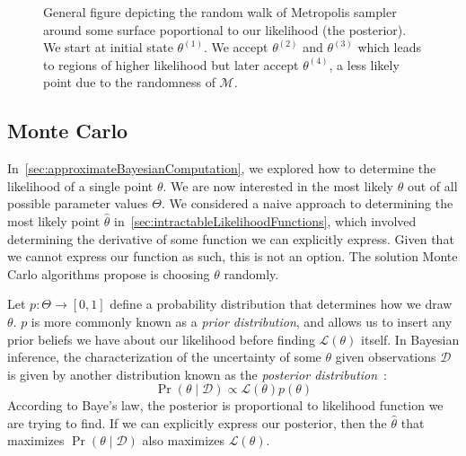 \begin{figure}[t]
    \centering{}
    \caption{General figure depicting the random walk of Metropolis sampler around some surface poportional to our
    likelihood (the posterior).
    We start at initial state $\theta^{(1)}$.
    We accept $\theta^{(2)}$ and $\theta^{(3)}$ which leads to regions of higher likelihood but later accept
    $\theta^{(4)}$, a less likely point due to the randomness of $\mathcal{M}$.
    }\label{fig:metropolisAlgorithm}
\end{figure}

\subsection{Monte Carlo}\label{subsec:monteCarlo}
In~\autoref{sec:approximateBayesianComputation}, we explored how to determine the likelihood of a single point $\theta$.
We are now interested in the most likely $\theta$ out of all possible parameter values $\Theta$.
We considered a naive approach to determining the most likely point $\hat{\theta}$
in~\autoref{sec:intractableLikelihoodFunctions}, which involved determining the derivative of some function we can
explicitly express.
Given that we cannot express our function as such, this is not an option.
The solution Monte Carlo algorithms propose is choosing $\theta$ randomly.

Let $p : \Theta \rightarrow [0, 1]$ define a probability distribution that determines how we draw $\theta$.
$p$ is more commonly known as a \emph{prior distribution}, and allows us to insert any prior beliefs we have about our
likelihood before finding $\mathcal{L}(\theta)$ itself.
In Bayesian inference, the characterization of the uncertainty of some $\theta$ given observations $\mathcal{D}$ is
given by another distribution known as the
\emph{posterior distribution}~\cite{lintusaariFundamentalsRecentDevelopments2017}:
\begin{equation}
    \Pr(\theta \mid \mathcal{D}) \propto \mathcal{L}(\theta) p(\theta)
\end{equation}
According to Baye's law, the posterior is proportional to likelihood function we are trying to find.
If we can explicitly express our posterior, then the $\hat{\theta}$ that maximizes $\Pr(\theta \mid \mathcal{D})$ also
maximizes $\mathcal{L}(\theta)$.

